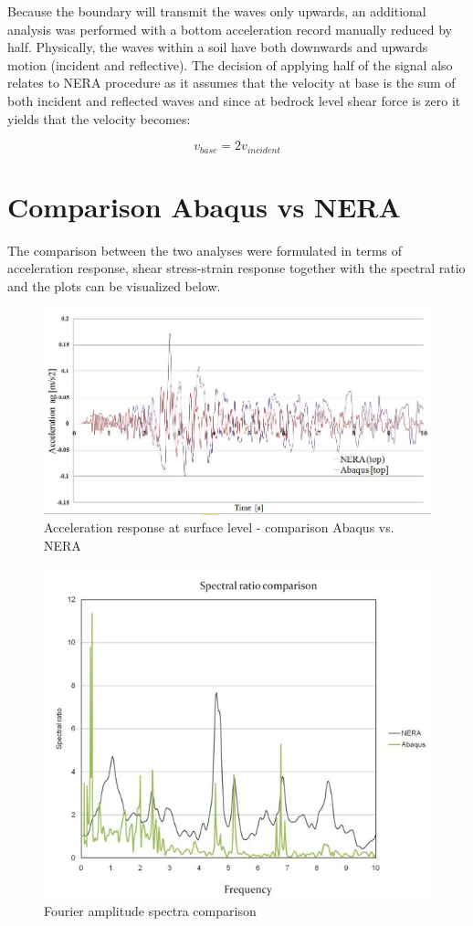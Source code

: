 	Because the boundary will transmit the waves only upwards, an additional analysis was performed with a bottom acceleration record manually reduced by half. Physically, the waves within a soil have both downwards and upwards motion (incident and reflective). The decision of applying half of the signal also relates to NERA procedure as it assumes that the velocity at base is the sum of both incident and reflected waves and since at bedrock level shear force is zero it yields that the velocity becomes:
	
	\begin{equation}
	v_{base}=2v_{incident}
	\end{equation} 
	
	\section{Comparison Abaqus vs NERA}
	The comparison between the two analyses were formulated in terms of acceleration response, shear stress-strain response together with the spectral ratio and the plots can be visualized below. 
	
	\begin{figure}[h!]
		\centering
		\includegraphics[width=0.7\linewidth]{"acc_comp1"}
		\caption{Acceleration response at surface level - comparison Abaqus vs. NERA}
		\label{comp1}
	\end{figure}
	
	\begin{figure}[h!]
		\centering
		\includegraphics[width=0.7\linewidth]{"spectral2"}
		\caption{Fourier amplitude spectra comparison}
		\label{fourier2}
	\end{figure}
	
